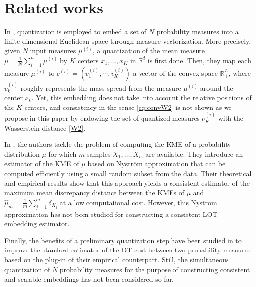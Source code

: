 \section{Related works}
\label{sec:works}
 
 In \cite{chazal21, royer2021atol},  quantization is employed to embed a set of $N$ probability measures into a finite-dimensional Euclidean space through measure vectorization. More precisely, given $N$ input measures $\mu^{(i)}$, a quantization of the mean measure $\bar{\mu} = \frac{1}{N}\sum_{i=1}^n \mu^{(i)}$ by $K$ centers $x_1,\ldots,x_K$  in  $\mathbb{R}^d$ is first done. Then, they map each measure $\mu^{(i)}$ to $v^{(i)}= (v^{(i)}_1,\cdots, v^{(i)}_K)$ a vector of the convex space $\mathbb{R}_{+}^K$, where $v^{(i)}_k$ roughly represents the mass spread from the measure $\mu^{(i)}$ around the center $x_k$.  %
 Yet, this embedding does not take into account the relative positions of the $K$ centers, and consistency in the sense \eqref{eq:convW2} is not shown as we propose in this paper by endowing the set of quantized measures $\nu^{(i)}_K$  with the Wasserstein distance \eqref{W2}.

 In \cite{pmlr-v162-chatalic22a}, the authors tackle the problem of computing the KME of a probability distribution $\mu$ for which $m$ samples $X_1,\ldots,X_m$  are available. They introduce an estimator of the KME of $\mu$ based on Nystr\"om approximation that can be computed efficiently using a small random subset  from the data. Their theoretical and empirical results show that this approach yields a consistent estimator of the maximum mean discrepancy distance between the KMEs of $\mu$ and $\hat{\mu}_{m} = \frac{1}{m} \sum_{j= 1}^{m} \delta_{X_j}$ at a low computational cost. However, this Nystr\"om approximation has not been studied for constructing a consistent LOT embedding  estimator.

Finally, the benefits of a preliminary quantization step have been studied in \cite{ beugnot2021improving} to improve  the standard estimator of the OT cost between two probability measures based on the plug-in of their empirical counterpart. Still, the simultaneous quantization of $N$ probability measures for the purpose of constructing consistent and scalable embeddings has not been considered so far.